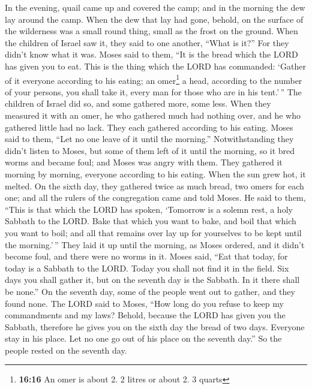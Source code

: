  In the evening, quail came up and covered the camp; and
in the morning the dew lay around the camp.  When the dew
that lay had gone, behold, on the surface of the wilderness was a small
round thing, small as the frost on the ground.  When the
children of Israel saw it, they said to one another, ``What is it?'' For
they didn't know what it was. Moses said to them, ``It is the bread
which the LORD has given you to eat.  This is the thing
which the LORD has commanded: `Gather of it everyone according to his
eating; an omer\footnote{\textbf{16:16} An omer is about 2. 2 litres or
  about 2. 3 quarts} a head, according to the number of your persons,
you shall take it, every man for those who are in his tent.'\,''
 The children of Israel did so, and some gathered more,
some less.  When they measured it with an omer, he who
gathered much had nothing over, and he who gathered little had no lack.
They each gathered according to his eating.  Moses said
to them, ``Let no one leave of it until the morning.'' 
Notwithstanding they didn't listen to Moses, but some of them left of it
until the morning, so it bred worms and became foul; and Moses was angry
with them.  They gathered it morning by morning, everyone
according to his eating. When the sun grew hot, it melted.
 On the sixth day, they gathered twice as much bread, two
omers for each one; and all the rulers of the congregation came and told
Moses.  He said to them, ``This is that which the LORD
has spoken, `Tomorrow is a solemn rest, a holy Sabbath to the LORD. Bake
that which you want to bake, and boil that which you want to boil; and
all that remains over lay up for yourselves to be kept until the
morning.'\,''  They laid it up until the morning, as
Moses ordered, and it didn't become foul, and there were no worms in it.
 Moses said, ``Eat that today, for today is a Sabbath to
the LORD. Today you shall not find it in the field.  Six
days you shall gather it, but on the seventh day is the Sabbath. In it
there shall be none.''  On the seventh day, some of the
people went out to gather, and they found none.  The LORD
said to Moses, ``How long do you refuse to keep my commandments and my
laws?  Behold, because the LORD has given you the
Sabbath, therefore he gives you on the sixth day the bread of two days.
Everyone stay in his place. Let no one go out of his place on the
seventh day.''  So the people rested on the seventh day.

